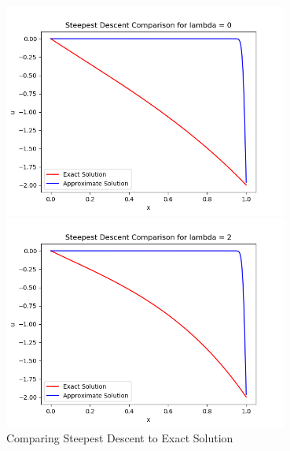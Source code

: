 \documentclass{article}
\begin{document}
\begin{figure}[H]
\centering
\caption{Comparing Steepest Descent to Exact Solution}
\begin{minipage}[b]{0.4\textwidth}
\includegraphics[height=7cm]{sd0}	
\end{minipage}
\hspace{0.6in}
\begin{minipage}[b]{0.4\textwidth}
\centering
\includegraphics[height=7cm]{sd2}	
\end{minipage}
\end{figure}
\end{document}
